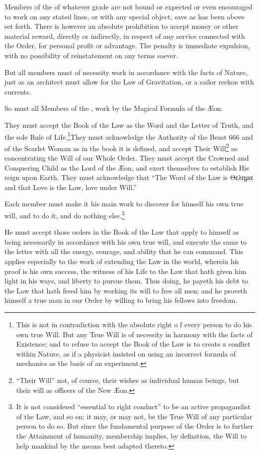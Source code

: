 Members of the \Argentium{} of whatever grade are not bound or expected or even encouraged to work on any stated lines, or with any special object, save as has been above set forth. There is however an absolute prohibition to accept money or other material reward, directly or indirectly, in respect of any service connected with the Order, for personal profit or advantage. The penalty is immediate expulsion, with no possibility of reinstatement on any terms soever.

But all members must of necessity work in accordance with the facts of Nature, just as an architect must allow for the Law of Gravitation, or a sailor reckon with currents.

So must all Members of the \Argentium{}, work by the Magical Formula of the \AE{}on.

They must accept the Book of the Law as the Word and the Letter of Truth, and the sole Rule of Life.\footnote{This is not in contradiction with the absolute right o f every person to do his own true Will. But any True Will is of necessity in harmony with the facts of Existence; and to refuse to accept the Book of the Law is to create a conflict within Nature, as if a physicist insisted on using an incorrect formula of mechanics as the basis of an experiment.}They must acknowledge the Authority of the Beast 666 and of the Scarlet Woman as in the book it is defined, and accept Their Will\footnote{\enquote{Their Will} \textemdash{} not, of course, their wishes as individual human beings, but their will as officers of the New \AE{}on.} as concentrating the Will of our Whole Order. They must accept the Crowned and Conquering Child as the Lord of the \AE{}on, and exert themselves to establish His reign upon Earth. They must acknowledge that \enquote{The Word of the Law is \textgreek{Θελημα} and that Love is the Law, love under Will.}

Each member must make it his main work to discover for himself his own true will, and to do it, and do nothing else.\footnote{It is not considered \enquote{essential to right conduct} to be an active propagandist of the Law, and so on; it may, or may not, be the True Will of any particular person to do so. But since the fundamental purpose of the Order is to further the Attainment of humanity, membership implies, by definition, the Will to help mankind by the means best adapted thereto.}

He must accept those orders in the Book of the Law that apply to himself as being necessarily in accordance with his own true will, and execute the same to the letter with all the energy, courage, and ability that he can command. This applies especially to the work of extending the Law in the world, wherein his proof is his own success, the witness of his Life to the Law that hath given him light in his ways, and liberty to pursue them. Thus doing, he payeth his debt to the Law that hath freed him by working its will to free all men; and he proveth himself a true man in our Order by willing to bring his fellows into freedom.

